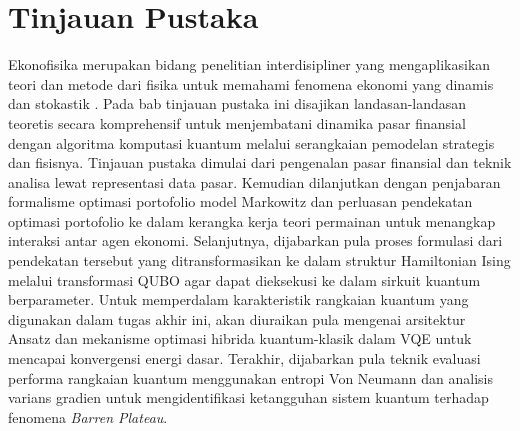 \chapter{Tinjauan Pustaka}

Ekonofisika merupakan bidang penelitian interdisipliner yang mengaplikasikan teori dan metode dari fisika untuk memahami fenomena ekonomi yang dinamis dan stokastik . Pada bab tinjauan pustaka ini disajikan landasan-landasan teoretis secara komprehensif untuk menjembatani dinamika pasar finansial dengan algoritma komputasi kuantum melalui serangkaian pemodelan strategis dan fisisnya. Tinjauan pustaka dimulai dari pengenalan pasar finansial dan teknik analisa lewat representasi data pasar. Kemudian dilanjutkan dengan penjabaran formalisme optimasi portofolio model Markowitz dan perluasan pendekatan optimasi portofolio ke dalam kerangka kerja teori permainan untuk menangkap interaksi antar agen ekonomi. Selanjutnya, dijabarkan pula proses formulasi dari pendekatan tersebut yang ditransformasikan ke dalam struktur Hamiltonian Ising melalui transformasi QUBO agar dapat dieksekusi ke dalam sirkuit kuantum berparameter. Untuk memperdalam karakteristik rangkaian kuantum yang digunakan dalam tugas akhir ini, akan diuraikan pula mengenai arsitektur Ansatz dan mekanisme optimasi hibrida kuantum-klasik dalam VQE untuk mencapai konvergensi energi dasar. Terakhir, dijabarkan pula teknik evaluasi performa rangkaian kuantum menggunakan entropi Von Neumann dan analisis varians gradien untuk mengidentifikasi ketangguhan sistem kuantum terhadap fenomena \textit{Barren Plateau}.
















